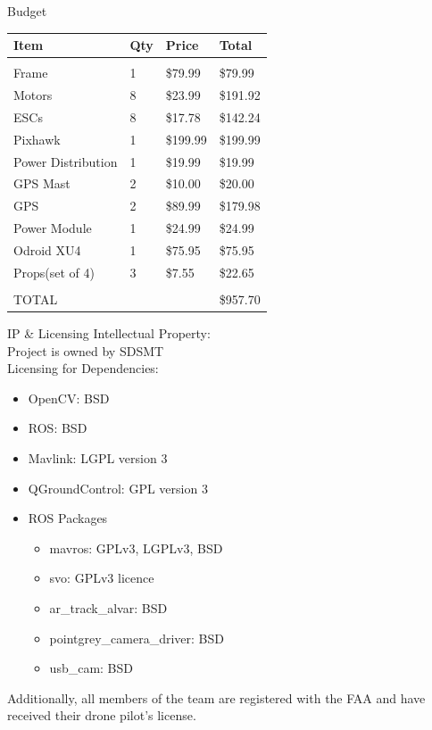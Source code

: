 \documentclass[11pt]{beamer}
\begin{document}
\begin{frame}{Budget}
\begin{table}[]
\centering
\begin{tabular}{|l|l|l|l|}
\hline
Item               & Qty & Price    & Total    \\ \hline
                   &     &          &          \\ \hline
Frame              & 1   & \$79.99  & \$79.99  \\ \hline
Motors             & 8   & \$23.99  & \$191.92 \\ \hline
ESCs               & 8   & \$17.78  & \$142.24 \\ \hline
Pixhawk            & 1   & \$199.99 & \$199.99 \\ \hline
Power Distribution & 1   & \$19.99  & \$19.99  \\ \hline
GPS Mast           & 2   & \$10.00  & \$20.00  \\ \hline
GPS                & 2   & \$89.99  & \$179.98 \\ \hline
Power Module       & 1   & \$24.99  & \$24.99  \\ \hline
Odroid XU4         & 1   & \$75.95  & \$75.95  \\ \hline
Props(set of 4)    & 3   & \$7.55   & \$22.65  \\ \hline
                   &     &          &          \\ \hline
TOTAL              &     &          & \$957.70 \\ \hline
\end{tabular}
\end{table}


\end{frame}


\begin{frame}{IP \& Licensing}
Intellectual Property:\\
Project is owned by SDSMT\\
\vspace{2mm}
Licensing for Dependencies:
\begin{itemize}
\item OpenCV: BSD 
\item ROS: BSD
\item Mavlink: LGPL version 3
\item QGroundControl: GPL version 3
\item ROS Packages
\begin{itemize}
\item mavros: GPLv3, LGPLv3, BSD
\item svo: GPLv3 licence
\item ar\_track\_alvar: BSD
\item pointgrey\_camera\_driver: BSD
\item usb\_cam: BSD
\end{itemize} 
\end{itemize}

Additionally, all members of the team are registered with the FAA and have received their drone pilot's license.

\end{frame}
\end{document}
